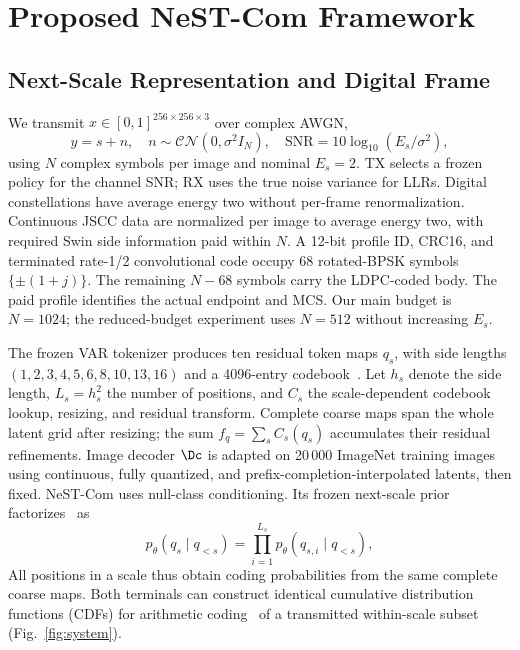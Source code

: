 \section{Proposed NeST-Com Framework}
\subsection{Next-Scale Representation and Digital Frame}
We transmit $x\in[0,1]^{256\times256\times3}$ over complex AWGN,
\begin{equation}
 y=s+n,\quad n\sim\mathcal{CN}(0,\sigma^2 I_N),\quad
 \mathrm{SNR}=10\log_{10}(E_s/\sigma^2),
 \label{eq:channel}
\end{equation}
using $N$ complex symbols per image and nominal $E_s=2$. TX selects a frozen policy for the channel SNR; RX uses the true noise variance for LLRs. Digital constellations have average energy two without per-frame renormalization. Continuous JSCC data are normalized per image to average energy two, with required Swin side information paid within $N$. A 12-bit profile ID, CRC16, and terminated rate-1/2 convolutional code occupy 68 rotated-BPSK symbols $\{\pm(1+j)\}$. The remaining $N-68$ symbols carry the LDPC-coded body. The paid profile identifies the actual endpoint and MCS. Our main budget is $N=1024$; the reduced-budget experiment uses $N=512$ without increasing $E_s$.

The frozen VAR tokenizer produces ten residual token maps $q_s$, with side lengths $(1,2,3,4,5,6,8,10,13,16)$ and a 4096-entry codebook~\cite{var}. Let $h_s$ denote the side length, $L_s=h_s^2$ the number of positions, and $C_s$ the scale-dependent codebook lookup, resizing, and residual transform. Complete coarse maps span the whole latent grid after resizing; the sum $f_q=\sum_s C_s(q_s)$ accumulates their residual refinements. Image decoder $\Dc$ is adapted on 20\,000 ImageNet training images using continuous, fully quantized, and prefix-completion-interpolated latents, then fixed. NeST-Com uses null-class conditioning. Its frozen next-scale prior factorizes~\cite{var} as
\begin{equation}
 p_\theta(q_s\mid q_{<s})=\prod_{i=1}^{L_s}p_\theta(q_{s,i}\mid q_{<s}),
 \label{eq:prior}
\end{equation}
All positions in a scale thus obtain coding probabilities from the same complete coarse maps. Both terminals can construct identical cumulative distribution functions (CDFs) for arithmetic coding~\cite{arithmetic} of a transmitted within-scale subset (Fig.~\ref{fig:system}).

